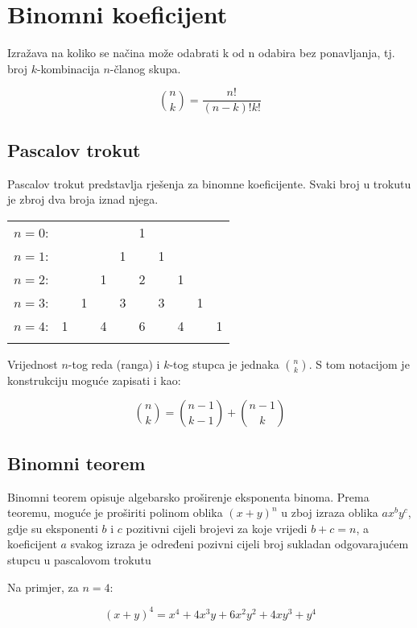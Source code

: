 \section{Binomni koeficijent}

Izražava na koliko se načina može odabrati k od n odabira bez ponavljanja, tj.
broj $k$-kombinacija $n$-članog skupa.

$$
{{n}\choose{k}} = \frac{n!}{(n-k)!k!}
$$

\subsection{Pascalov trokut}

Pascalov trokut predstavlja rješenja za binomne koeficijente. Svaki broj u
trokutu je zbroj dva broja iznad njega.

\begin{tabular}{rccccccccc}
    $n=0$:&    &    &    &    &  1\\\noalign{\smallskip\smallskip}
    $n=1$:&    &    &    &  1 &    &  1\\\noalign{\smallskip\smallskip}
    $n=2$:&    &    &  1 &    &  2 &    &  1\\\noalign{\smallskip\smallskip}
    $n=3$:&    &  1 &    &  3 &    &  3 &    &  1\\\noalign{\smallskip\smallskip}
    $n=4$:&  1 &    &  4 &    &  6 &    &  4 &    &  1\\\noalign{\smallskip\smallskip}
\end{tabular}

Vrijednost $n$-tog reda (ranga) i $k$-tog stupca je jednaka $\binom{n}{k}$. S
tom notacijom je konstrukciju moguće zapisati i kao:

$$
\binom{n}{k} = \binom{n-1}{k-1} + \binom{n-1}{k}
$$

\subsection{Binomni teorem}

Binomni teorem opisuje algebarsko proširenje eksponenta binoma. Prema teoremu,
moguće je proširiti polinom oblika $(x+y)^n$ u zboj izraza oblika $ax^by^c$,
gdje su eksponenti $b$ i $c$ pozitivni cijeli brojevi za koje vrijedi $b+c=n$, a
koeficijent $a$ svakog izraza je određeni pozivni cijeli broj sukladan
odgovarajućem stupcu u pascalovom trokutu

Na primjer, za $n=4$:

$$
(x+y)^4=x^4+4x^3y+6x^2y^2+4xy^3+y^4
$$

